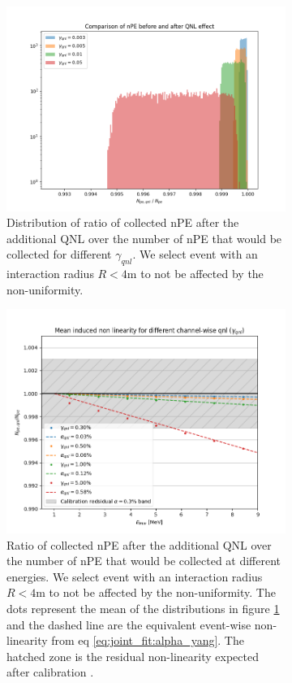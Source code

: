 \documentclass[../main.tex]{subfiles}
\begin{document}
\begin{figure}
  \centering
  \begin{subfigure}[t]{0.48\linewidth}
    \includegraphics[width=\linewidth]{images/joint_fit/gamma_eff.png}
    \caption{Distribution of ratio of collected nPE after the additional QNL over the number of nPE that would be collected for different $\gamma_{qnl}$. We select event with an interaction radius $R < 4$m to not be affected by the non-uniformity.}
    \label{fig:joint_fit:ratio_distrib}
  \end{subfigure}
  \hfill
  \begin{subfigure}[t]{0.48\linewidth}
    \includegraphics[width=\linewidth]{images/joint_fit/gamma_to_alpha.png}
    \caption{Ratio of collected nPE after the additional QNL over the number of nPE that would be collected at different energies. We select event with an interaction radius $R < 4$m to not be affected by the non-uniformity. The dots represent the mean of the distributions in figure \ref{fig:joint_fit:ratio_distrib} and the dashed line are the equivalent event-wise non-linearity from eq \ref{eq:joint_fit:alpha_yang}. The hatched zone is the residual non-linearity expected after calibration \cite{juno_collaboration_calibration_2021}.}
    \label{fig:joint_fit:gamma_v_alpha}
  \end{subfigure}
  \caption{}
\end{figure}
\end{document}
